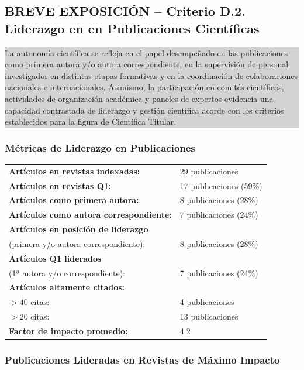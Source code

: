\documentclass[11pt,a4paper]{article}
\newcommand{\breveexposicion}[2]{
    \subsection*{\color{darkgray}\textbf{BREVE EXPOSICIÓN -- #1}}
    \vspace{0.3em}
    \noindent\colorbox{lightgray}{%
        \begin{minipage}{0.97\textwidth}
        \vspace{0.5em}
        \color{darkgray}
        #2
        \vspace{0.5em}
        \end{minipage}
    }
    \vspace{1em}
}
\begin{document}
\breveexposicion{Criterio D.2. Liderazgo en en Publicaciones Científicas}{

La autonomía científica se refleja en el papel desempeñado en las publicaciones como primera autora y/o autora correspondiente, en la supervisión de personal investigador en distintas etapas formativas y en la coordinación de colaboraciones nacionales e internacionales. Asimismo, la participación en comités científicos, actividades de organización académica y paneles de expertos evidencia una capacidad contrastada de liderazgo y gestión científica acorde con los criterios establecidos para la figura de Científica Titular.
}

\subsubsection{Métricas de Liderazgo en Publicaciones}

\begin{tabular}{ll}
    \textbf{Artículos en revistas indexadas:} & 29 publicaciones \\
    \textbf{Artículos en revistas Q1:} & 17 publicaciones (59\%) \\
    \textbf{Artículos como primera autora:} & 8 publicaciones (28\%) \\
    \textbf{Artículos como autora correspondiente:} & 7 publicaciones (24\%) \\
    \textbf{Artículos en posición de liderazgo} & \\
    \quad (primera y/o autora correspondiente): & 8 publicaciones (28\%) \\
    \textbf{Artículos Q1 liderados} & \\
    \quad (1ª autora y/o correspondiente): & 7 publicaciones (24\%) \\
    \textbf{Artículos altamente citados:} & \\
    \quad $>$40 citas: & 4 publicaciones \\
    \quad $>$20 citas: & 13 publicaciones \\
    \textbf{Factor de impacto promedio:} & 4.2 \\
\end{tabular}

\subsubsection{Publicaciones Lideradas en Revistas de Máximo Impacto}
\end{document}
